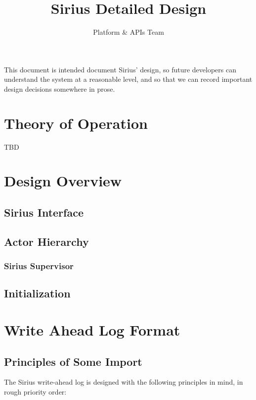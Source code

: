\documentclass[11pt]{article}
\begin{document}
\title{Sirius Detailed Design}
\author{Platform \& APIs Team}
\maketitle

This document is intended document Sirius’ design, so future developers can understand the system at a reasonable level, and so that we can record important design decisions somewhere in prose.  

\section{Theory of Operation}
TBD


\section{Design Overview}
\subsection{Sirius Interface}

\subsection{Actor Hierarchy}

\subsubsection{Sirius Supervisor}

\subsection{Initialization}

\section{Write Ahead Log Format}

\subsection{Principles of Some Import}
The Sirius write-ahead log is designed with the following principles in mind, in rough priority order:
\end{document}

